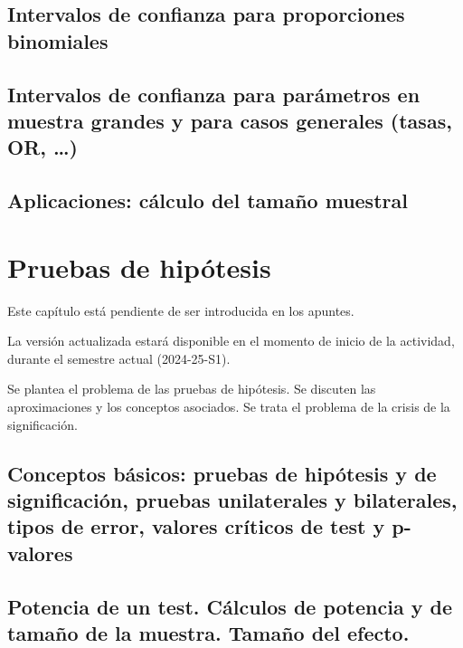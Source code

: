 \documentclass[
]{article}
\begin{document}
\subsection{Intervalos de confianza para proporciones binomiales}\label{intervalos-de-confianza-para-proporciones-binomiales}

\subsection{Intervalos de confianza para parámetros en muestra grandes y para casos generales (tasas, OR, \ldots)}\label{intervalos-de-confianza-para-paruxe1metros-en-muestra-grandes-y-para-casos-generales-tasas-or}

\subsection{Aplicaciones: cálculo del tamaño muestral}\label{aplicaciones-cuxe1lculo-del-tamauxf1o-muestral}

\section{Pruebas de hipótesis}\label{pruebas-de-hipuxf3tesis}

Este capítulo está pendiente de ser introducida en los apuntes.

La versión actualizada estará disponible en el momento de inicio de la actividad, durante el semestre actual (2024-25-S1).

Se plantea el problema de las pruebas de hipótesis. Se discuten las aproximaciones y los conceptos asociados. Se trata el problema de la crisis de la significación.

\subsection{Conceptos básicos: pruebas de hipótesis y de significación, pruebas unilaterales y bilaterales, tipos de error, valores críticos de test y p-valores}\label{conceptos-buxe1sicos-pruebas-de-hipuxf3tesis-y-de-significaciuxf3n-pruebas-unilaterales-y-bilaterales-tipos-de-error-valores-cruxedticos-de-test-y-p-valores}

\subsection{Potencia de un test. Cálculos de potencia y de tamaño de la muestra. Tamaño del efecto.}\label{potencia-de-un-test.-cuxe1lculos-de-potencia-y-de-tamauxf1o-de-la-muestra.-tamauxf1o-del-efecto.}
\end{document}
